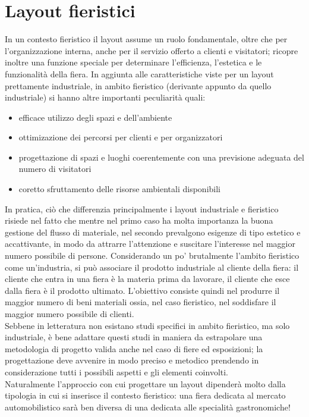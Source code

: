 \documentclass[12pt,a4paper,openright,twoside]{report}
\begin{document}
\section{Layout fieristici}
In un contesto fieristico il layout assume un ruolo fondamentale, oltre che per l'organizzazione interna, anche per il servizio offerto a clienti e visitatori; ricopre inoltre una funzione speciale per determinare l'efficienza, l'estetica e le funzionalit\`{a} della fiera.
In aggiunta alle caratteristiche viste per un layout prettamente industriale, in ambito fieristico (derivante appunto da quello industriale) si hanno altre importanti peculiarit\`{a} quali:
\begin{itemize}
\item efficace utilizzo degli spazi e dell'ambiente
\item ottimizazione dei percorsi per clienti e per organizzatori
\item progettazione di spazi e luoghi coerentemente con una previsione adeguata del numero di visitatori
\item coretto sfruttamento delle risorse ambientali disponibili
\end{itemize}
In pratica, ci\`{o} che differenzia principalmente i layout industriale e fieristico risiede nel fatto che mentre nel primo caso ha molta importanza la buona gestione del flusso di materiale, nel secondo prevalgono esigenze di tipo estetico e accattivante, in modo da attrarre l'attenzione e suscitare l'interesse nel maggior numero possibile di persone.
Considerando un po' brutalmente l'ambito fieristico come un'industria, si pu\`{o} associare il prodotto industriale al cliente della fiera: il cliente che entra in una fiera \`{e} la materia prima da lavorare, il cliente che esce dalla fiera \`{e} il prodotto ultimato. L'obiettivo consiste quindi nel produrre il maggior numero di beni materiali ossia, nel caso fieristico, nel soddisfare il maggior numero possibile di clienti.\\
Sebbene in letteratura non esistano studi specifici in ambito fieristico, ma solo industriale, \`{e} bene adattare questi studi in maniera da estrapolare una metodologia di progetto valida anche nel caso di fiere ed esposizioni; la progettazione deve avvenire in modo preciso e metodico prendendo in considerazione tutti i possibili aspetti e gli elementi coinvolti.\\
Naturalmente l'approccio con cui progettare un layout dipender\`{a} molto dalla tipologia in cui si inserisce il contesto fieristico: una fiera dedicata al mercato automobilistico sar\`{a} ben diversa di una dedicata alle specialit\`{a} gastronomiche!
\end{document}
